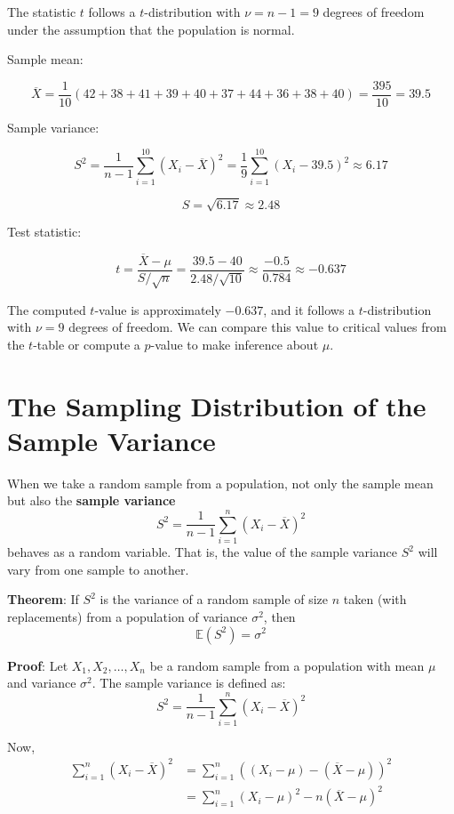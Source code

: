 \documentclass[twoside]{book}
\begin{document}
The statistic \( t \) follows a \( t \)-distribution with \( \nu = n - 1 = 9 \) degrees of freedom under the assumption that the population is normal.

Sample mean:

\[
\overline{X} = \frac{1}{10} (42 + 38 + 41 + 39 + 40 + 37 + 44 + 36 + 38 + 40) = \frac{395}{10} = 39.5
\]

Sample variance:

\[
S^2 = \frac{1}{n - 1} \sum_{i=1}^{10} (X_i - \overline{X})^2 = \frac{1}{9} \sum_{i=1}^{10} (X_i - 39.5)^2 \approx 6.17
\]

\[
S = \sqrt{6.17} \approx 2.48
\]

Test statistic:

\[
t = \frac{\overline{X} - \mu}{S / \sqrt{n}} = \frac{39.5 - 40}{2.48 / \sqrt{10}} \approx \frac{-0.5}{0.784} \approx -0.637
\]

The computed \( t \)-value is approximately \( -0.637 \), and it follows a \( t \)-distribution with \( \nu = 9 \) degrees of freedom. We can compare this value to critical values from the \( t \)-table or compute a \( p \)-value to make inference about \( \mu \).

\section{The Sampling Distribution of the Sample Variance}
When we take a random sample from a population, not only the sample mean but also the \textbf{sample variance}
\[
S^2 = \frac{1}{n - 1} \sum_{i=1}^{n} (X_i - \overline{X})^2
\]
behaves as a random variable. That is, the value of the sample variance \( S^2 \) will vary from one sample to another.

\begin{textbox}
\textbf{Theorem}: If $S^2$ is the variance of a random sample of size $n$ taken (with replacements) from a population of variance $\sigma^2$, then
\[
\mathbb{E}(S^2) = \sigma^2
\]
\end{textbox}

\textbf{Proof}: Let \( X_1, X_2, \dots, X_n \) be a random sample from a population with mean \( \mu \) and variance \( \sigma^2 \). The sample variance is defined as:
\[
S^2 = \frac{1}{n - 1} \sum_{i=1}^{n} (X_i - \overline{X})^2
\]

Now,
\begin{align*}
\sum_{i=1}^{n} (X_i - \overline{X})^2 &= \sum_{i=1}^{n} \left( (X_i - \mu) - (\overline{X} - \mu)\right) ^2\\
&= \sum_{i=1}^{n} (X_i - \mu)^2 - n(\overline{X} - \mu)^2
\end{align*}
\end{document}
